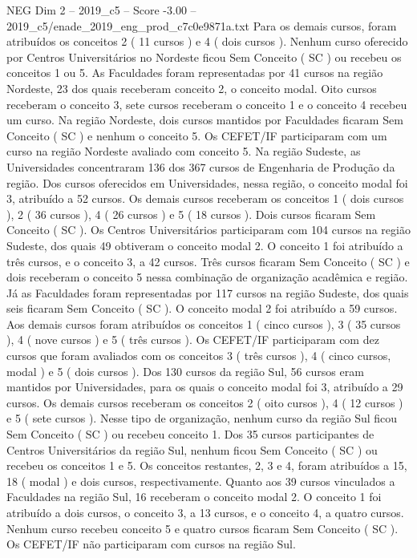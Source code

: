 \begin{textsample}{NEG Dim 2 – 2019\_c5 – Score -3.00 – 2019\_c5/enade\_2019\_eng\_prod\_c7c0e9871a.txt}
Para os demais cursos, foram atribuídos os conceitos 2 ( 11 cursos ) e 4 ( dois cursos ).
Nenhum curso oferecido por Centros Universitários no Nordeste ficou Sem Conceito ( SC ) ou recebeu os conceitos 1 ou 5.
As Faculdades foram representadas por 41 cursos na região Nordeste, 23 dos quais receberam conceito 2, o conceito modal.
Oito cursos receberam o conceito 3, sete cursos receberam o conceito 1 e o conceito 4 recebeu um curso.
Na região Nordeste, dois cursos mantidos por Faculdades ficaram Sem Conceito ( SC ) e nenhum o conceito 5.
Os CEFET/IF participaram com um curso na região Nordeste avaliado com conceito 5.
Na região Sudeste, as Universidades concentraram 136 dos 367 cursos de Engenharia de Produção da região.
Dos cursos oferecidos em Universidades, nessa região, o conceito modal foi 3, atribuído a 52 cursos.
Os demais cursos receberam os conceitos 1 ( dois cursos ), 2 ( 36 cursos ), 4 ( 26 cursos ) e 5 ( 18 cursos ).
Dois cursos ficaram Sem Conceito ( SC ).
Os Centros Universitários participaram com 104 cursos na região Sudeste, dos quais 49 obtiveram o conceito modal 2.
O conceito 1 foi atribuído a três cursos, e o conceito 3, a 42 cursos.
Três cursos ficaram Sem Conceito ( SC ) e dois receberam o conceito 5 nessa combinação de organização acadêmica e região.
Já as Faculdades foram representadas por 117 cursos na região Sudeste, dos quais seis ficaram Sem Conceito ( SC ).
O conceito modal 2 foi atribuído a 59 cursos.
Aos demais cursos foram atribuídos os conceitos 1 ( cinco cursos ), 3 ( 35 cursos ), 4 ( nove cursos ) e 5 ( três cursos ).
Os CEFET/IF participaram com dez cursos que foram avaliados com os conceitos 3 ( três cursos ), 4 ( cinco cursos, modal ) e 5 ( dois cursos ).
Dos 130 cursos da região Sul, 56 cursos eram mantidos por Universidades, para os quais o conceito modal foi 3, atribuído a 29 cursos.
Os demais cursos receberam os conceitos 2 ( oito cursos ), 4 ( 12 cursos ) e 5 ( sete cursos ).
Nesse tipo de organização, nenhum curso da região Sul ficou Sem Conceito ( SC ) ou recebeu conceito 1.
Dos 35 cursos participantes de Centros Universitários da região Sul, nenhum ficou Sem Conceito ( SC ) ou recebeu os conceitos 1 e 5.
Os conceitos restantes, 2, 3 e 4, foram atribuídos a 15, 18 ( modal ) e dois cursos, respectivamente.
Quanto aos 39 cursos vinculados a Faculdades na região Sul, 16 receberam o conceito modal 2.
O conceito 1 foi atribuído a dois cursos, o conceito 3, a 13 cursos, e o conceito 4, a quatro cursos.
Nenhum curso recebeu conceito 5 e quatro cursos ficaram Sem Conceito ( SC ).
Os CEFET/IF não participaram com cursos na região Sul.

\end{textsample}
